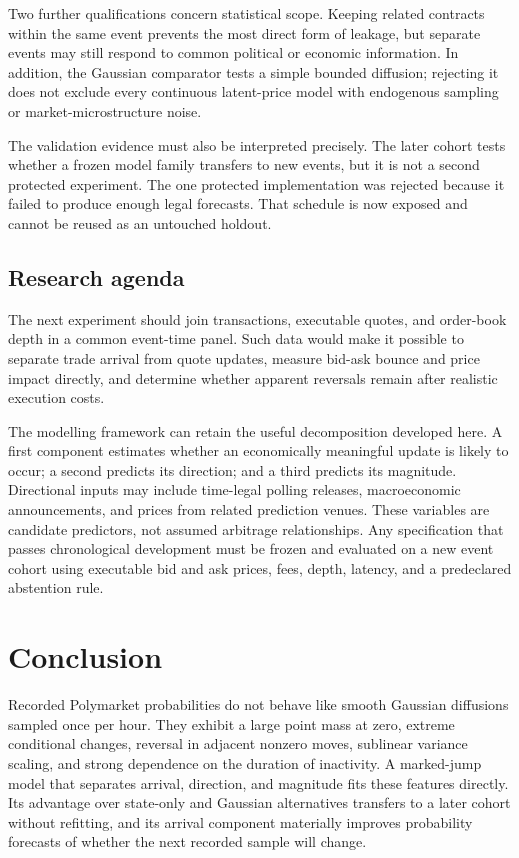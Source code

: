 \documentclass[11pt]{article}
\begin{document}
Two further qualifications concern statistical scope. Keeping related contracts within the same
event prevents the most direct form of leakage, but separate events may still respond to common
political or economic information. In addition, the Gaussian comparator tests a simple bounded
diffusion; rejecting it does not exclude every continuous latent-price model with endogenous
sampling or market-microstructure noise.

The validation evidence must also be interpreted precisely. The later cohort tests whether a
frozen model family transfers to new events, but it is not a second protected experiment. The one
protected implementation was rejected because it failed to produce enough legal forecasts. That
schedule is now exposed and cannot be reused as an untouched holdout.

\subsection{Research agenda}

The next experiment should join transactions, executable quotes, and order-book depth in a common
event-time panel. Such data would make it possible to separate trade arrival from quote updates,
measure bid-ask bounce and price impact directly, and determine whether apparent reversals remain
after realistic execution costs.

The modelling framework can retain the useful decomposition developed here. A first component
estimates whether an economically meaningful update is likely to occur; a second predicts its
direction; and a third predicts its magnitude. Directional inputs may include time-legal polling
releases, macroeconomic announcements, and prices from related prediction venues. These variables
are candidate predictors, not assumed arbitrage relationships. Any specification that passes
chronological development must be frozen and evaluated on a new event cohort using executable
bid and ask prices, fees, depth, latency, and a predeclared abstention rule.

\section{Conclusion}

Recorded Polymarket probabilities do not behave like smooth Gaussian diffusions sampled once per
hour. They exhibit a large point mass at zero, extreme conditional changes, reversal in adjacent
nonzero moves, sublinear variance scaling, and strong dependence on the duration of inactivity.
A marked-jump model that separates arrival, direction, and magnitude fits these features directly.
Its advantage over state-only and Gaussian alternatives transfers to a later cohort without
refitting, and its arrival component materially improves probability forecasts of whether the
next recorded sample will change.
\end{document}
